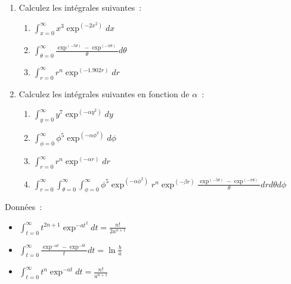 
\begin{enumerate}
\item Calculez les int\'egrales suivantes~:
\begin{enumerate}
\item $\displaystyle \int_{x=0}^\infty x^3\exp^{(-2x^2)}dx$

\item $\displaystyle \int_{\theta=0}^\infty \frac{\exp^{(-5\theta)}-\exp^{(-\pi\theta)}}{\theta} d\theta$

\item $\displaystyle \int_{r=0}^\infty r^n\exp^{(-1.902r)}dr$
\end{enumerate}

\item Calculez les int\'egrales suivantes en fonction de $\alpha$~:
\begin{enumerate}
\item $\displaystyle \int_{y=0}^\infty y^7\exp^{(-\alpha y^2)}dy$
\item $\displaystyle \int_{\phi=0}^\infty \phi^{5}\exp^{(-\alpha\phi^2)}d\phi$
\item $\displaystyle \int_{r=0}^\infty r^n\exp^{(-\alpha r)}dr$
\item $\displaystyle \int_{r=0}^\infty\int_{\theta=0}^\infty\int_{\phi=0}^\infty \phi^{5}\exp^{(-\alpha\phi^2)}r^n\exp^{(-\beta r)} \frac{\exp^{(-5\theta)}-\exp^{(-\pi\theta)}}{\theta} drd\theta d\phi$
\end{enumerate}
\end{enumerate}

\vrule

Donn\'ees~:

\vspace{0.3cm}

\begin{itemize}
\item $\displaystyle \int_{t=0}^\infty t^{2n+1}\exp^{-at^2}dt = \frac{n!}{2a^{n+1}}$

\item $\displaystyle \int_{t=0}^\infty \frac{\exp^{-at} - \exp^{-bt}}{t}dt = \ln\frac{b}{a}$

\item $\displaystyle \int_{t=0}^\infty t^n\exp^{-at}dt = \frac{n!}{a^{n+1}}$
\end{itemize}

\clearpage

